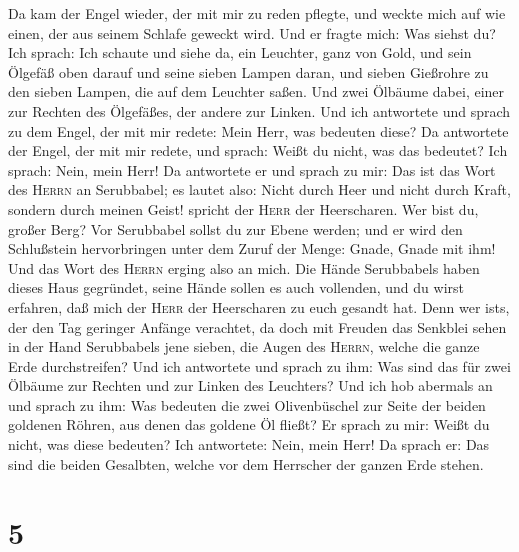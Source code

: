  Da kam der Engel wieder, der mit mir zu reden pflegte,
und weckte mich auf wie einen, der aus seinem Schlafe geweckt wird.
 Und er fragte mich: Was siehst du? Ich sprach: Ich
schaute und siehe da, ein Leuchter, ganz von Gold, und sein Ölgefäß oben
darauf und seine sieben Lampen daran, und sieben Gießrohre zu den sieben
Lampen, die auf dem Leuchter saßen.  Und zwei Ölbäume
dabei, einer zur Rechten des Ölgefäßes, der andere zur Linken.
 Und ich antwortete und sprach zu dem Engel, der mit mir
redete: Mein Herr, was bedeuten diese?  Da antwortete der
Engel, der mit mir redete, und sprach: Weißt du nicht, was das bedeutet?
Ich sprach: Nein, mein Herr!  Da antwortete er und sprach
zu mir: Das ist das Wort des \textsc{Herrn} an Serubbabel; es lautet
also: Nicht durch Heer und nicht durch Kraft, sondern durch meinen
Geist! spricht der \textsc{Herr} der Heerscharen.  Wer
bist du, großer Berg? Vor Serubbabel sollst du zur Ebene werden; und er
wird den Schlußstein hervorbringen unter dem Zuruf der Menge: Gnade,
Gnade mit ihm!  Und das Wort des \textsc{Herrn} erging
also an mich.  Die Hände Serubbabels haben dieses Haus
gegründet, seine Hände sollen es auch vollenden, und du wirst erfahren,
daß mich der \textsc{Herr} der Heerscharen zu euch gesandt hat.
 Denn wer ist\textquotesingle s, der den Tag geringer
Anfänge verachtet, da doch mit Freuden das Senkblei sehen in der Hand
Serubbabels jene sieben, die Augen des \textsc{Herrn}, welche die ganze
Erde durchstreifen?  Und ich antwortete und sprach zu
ihm: Was sind das für zwei Ölbäume zur Rechten und zur Linken des
Leuchters?  Und ich hob abermals an und sprach zu ihm:
Was bedeuten die zwei Olivenbüschel zur Seite der beiden goldenen
Röhren, aus denen das goldene Öl fließt?  Er sprach zu
mir: Weißt du nicht, was diese bedeuten?  Ich antwortete:
Nein, mein Herr! Da sprach er: Das sind die beiden Gesalbten, welche vor
dem Herrscher der ganzen Erde stehen.

\hypertarget{section-4}{%
\section{5}\label{section-4}}

